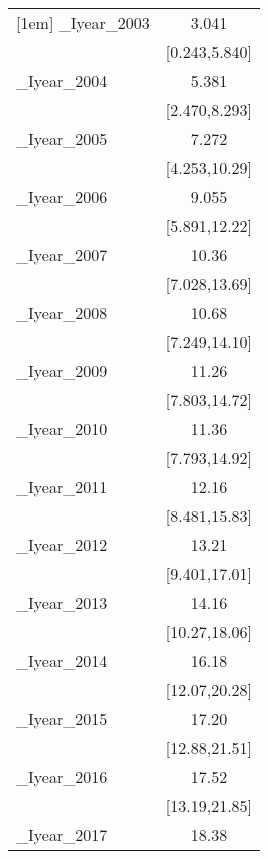 {\begin{tabular}{l*{1}{c}}
[1em]
\_Iyear\_2003 &                 3.041\sym{*}  \\
            &         [0.243,5.840]         \\
[1em]
\_Iyear\_2004 &                 5.381\sym{***}\\
            &         [2.470,8.293]         \\
[1em]
\_Iyear\_2005 &                 7.272\sym{***}\\
            &         [4.253,10.29]         \\
[1em]
\_Iyear\_2006 &                 9.055\sym{***}\\
            &         [5.891,12.22]         \\
[1em]
\_Iyear\_2007 &                 10.36\sym{***}\\
            &         [7.028,13.69]         \\
[1em]
\_Iyear\_2008 &                 10.68\sym{***}\\
            &         [7.249,14.10]         \\
[1em]
\_Iyear\_2009 &                 11.26\sym{***}\\
            &         [7.803,14.72]         \\
[1em]
\_Iyear\_2010 &                 11.36\sym{***}\\
            &         [7.793,14.92]         \\
[1em]
\_Iyear\_2011 &                 12.16\sym{***}\\
            &         [8.481,15.83]         \\
[1em]
\_Iyear\_2012 &                 13.21\sym{***}\\
            &         [9.401,17.01]         \\
[1em]
\_Iyear\_2013 &                 14.16\sym{***}\\
            &         [10.27,18.06]         \\
[1em]
\_Iyear\_2014 &                 16.18\sym{***}\\
            &         [12.07,20.28]         \\
[1em]
\_Iyear\_2015 &                 17.20\sym{***}\\
            &         [12.88,21.51]         \\
[1em]
\_Iyear\_2016 &                 17.52\sym{***}\\
            &         [13.19,21.85]         \\
[1em]
\_Iyear\_2017 &                 18.38\sym{***}\\

\end{tabular}}
